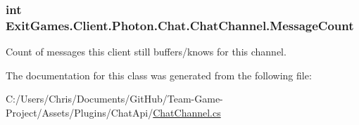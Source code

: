 \subsubsection[{\texorpdfstring{Message\+Count}{MessageCount}}]{\setlength{\rightskip}{0pt plus 5cm}int Exit\+Games.\+Client.\+Photon.\+Chat.\+Chat\+Channel.\+Message\+Count\hspace{0.3cm}{\ttfamily [get]}}\hypertarget{class_exit_games_1_1_client_1_1_photon_1_1_chat_1_1_chat_channel_a91a15ffc97cfd40eea6cf7965b99e5dc}{}\label{class_exit_games_1_1_client_1_1_photon_1_1_chat_1_1_chat_channel_a91a15ffc97cfd40eea6cf7965b99e5dc}


Count of messages this client still buffers/knows for this channel.



The documentation for this class was generated from the following file\+:\begin{DoxyCompactItemize}
\item 
C\+:/\+Users/\+Chris/\+Documents/\+Git\+Hub/\+Team-\/\+Game-\/\+Project/\+Assets/\+Plugins/\+Chat\+Api/\hyperlink{_chat_channel_8cs}{Chat\+Channel.\+cs}\end{DoxyCompactItemize}
